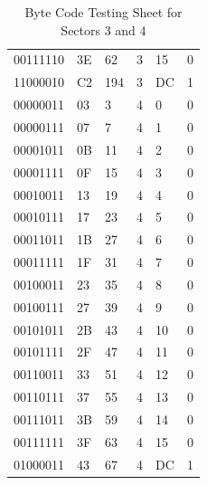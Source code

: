 \documentclass[12pt,a4paper]{report}
\begin{document}
\begin{table}[H]
\begin{tabular}{llllll}
00111110                                               & 3E        & 62            & 3      & 15     & 0       \\
11000010                                               & C2        & 194           & 3      & DC     & 1       \\
00000011                                               & 03        & 3             & 4      & 0      & 0       \\
00000111                                               & 07        & 7             & 4      & 1      & 0       \\
00001011                                               & 0B        & 11            & 4      & 2      & 0       \\
00001111                                               & 0F        & 15            & 4      & 3      & 0       \\
00010011                                               & 13        & 19            & 4      & 4      & 0       \\
00010111                                               & 17        & 23            & 4      & 5      & 0       \\
00011011                                               & 1B        & 27            & 4      & 6      & 0       \\
00011111                                               & 1F        & 31            & 4      & 7      & 0       \\
00100011                                               & 23        & 35            & 4      & 8      & 0       \\
00100111                                               & 27        & 39            & 4      & 9      & 0       \\
00101011                                               & 2B        & 43            & 4      & 10     & 0       \\
00101111                                               & 2F        & 47            & 4      & 11     & 0       \\
00110011                                               & 33        & 51            & 4      & 12     & 0       \\
00110111                                               & 37        & 55            & 4      & 13     & 0       \\
00111011                                               & 3B        & 59            & 4      & 14     & 0       \\
00111111                                               & 3F        & 63            & 4      & 15     & 0       \\
01000011                                               & 43        & 67            & 4      & DC     & 1 
\end{tabular}
\caption{Byte Code Testing Sheet for Sectors 3 and 4} %
\label{tab:Testing Table Sectors 3 and 4}   
\end{table}
\end{document}
